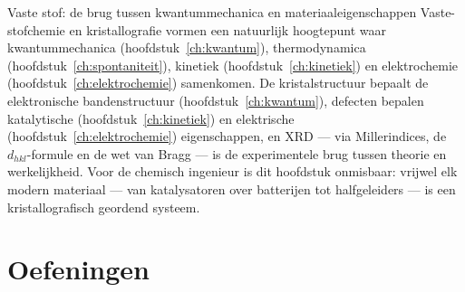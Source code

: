 \begin{besluit}{Vaste stof: de brug tussen kwantummechanica en materiaaleigenschappen}
Vaste-stofchemie en kristallografie vormen een natuurlijk hoogtepunt waar kwantummechanica (hoofdstuk~\ref{ch:kwantum}), thermodynamica (hoofdstuk~\ref{ch:spontaniteit}), kinetiek (hoofdstuk~\ref{ch:kinetiek}) en elektrochemie (hoofdstuk~\ref{ch:elektrochemie}) samenkomen. De kristalstructuur bepaalt de elektronische bandenstructuur (hoofdstuk~\ref{ch:kwantum}), defecten bepalen katalytische (hoofdstuk~\ref{ch:kinetiek}) en elektrische (hoofdstuk~\ref{ch:elektrochemie}) eigenschappen, en XRD --- via Millerindices, de $d_{hkl}$-formule en de wet van Bragg --- is de experimentele brug tussen theorie en werkelijkheid. Voor de chemisch ingenieur is dit hoofdstuk onmisbaar: vrijwel elk modern materiaal --- van katalysatoren over batterijen tot halfgeleiders --- is een kristallografisch geordend systeem.
\end{besluit}

\newpage
\section{Oefeningen}


